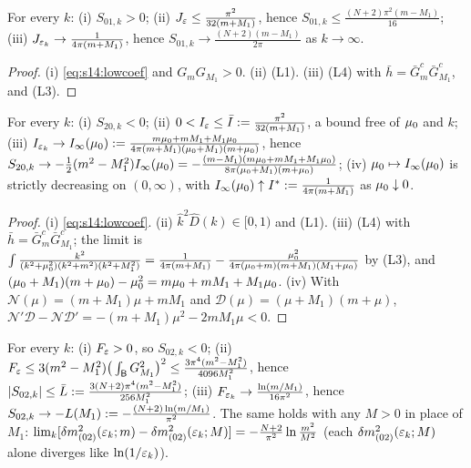 \begin{lemma}\label{lem:s14:A}
For every $k$: \textup{(i)} $S_{01,k}>0$; \textup{(ii)} $J_{\varepsilon}\le\frac{\pi^2}{32(m+M_1)}$, hence $S_{01,k}\le\frac{(N+2)\pi^2(m-M_1)}{16}$; \textup{(iii)} $J_{\varepsilon_k}\to\frac1{4\pi(m+M_1)}$, hence $S_{01,k}\to\frac{(N+2)(m-M_1)}{2\pi}$ as $k\to\infty$.
\end{lemma}

\begin{proof}
(i) \eqref{eq:s14:lowcoef} and $G_mG_{M_1}>0$. (ii) (L1). (iii) (L4) with $\bar h=\bar G^c_m\bar G^c_{M_1}$, and (L3).
\end{proof}

\begin{lemma}[order $e^2$]\label{lem:s14:B}
For every $k$: \textup{(i)} $S_{20,k}<0$; \textup{(ii)} $0<I_{\varepsilon}\le\bar I:=\frac{\pi^2}{32(m+M_1)}$, a bound free of $\mu_0$ and $k$; \textup{(iii)} $I_{\varepsilon_k}\to I_\infty(\mu_0):=\frac{m\mu_0+mM_1+M_1\mu_0}{4\pi(m+M_1)(\mu_0+M_1)(m+\mu_0)}$, hence $S_{20,k}\to-\frac12(m^2-M_1^2)I_\infty(\mu_0)=-\frac{(m-M_1)(m\mu_0+mM_1+M_1\mu_0)}{8\pi(\mu_0+M_1)(m+\mu_0)}$; \textup{(iv)} $\mu_0\mapsto I_\infty(\mu_0)$ is strictly decreasing on $(0,\infty)$, with $I_\infty(\mu_0)\uparrow I^*:=\frac1{4\pi(m+M_1)}$ as $\mu_0\downarrow0$.
\end{lemma}

\begin{proof}
(i) \eqref{eq:s14:lowcoef}. (ii) $\hat k^2\hat D(k)\in[0,1)$ and (L1). (iii) (L4) with $\bar h=\bar G^c_m\bar G^c_{M_1}$; the limit is $\int\frac{k^2}{(k^2+\mu_0^2)(k^2+m^2)(k^2+M_1^2)}=\frac1{4\pi(m+M_1)}-\frac{\mu_0^2}{4\pi(\mu_0+m)(m+M_1)(M_1+\mu_0)}$ by (L3), and $(\mu_0+M_1)(m+\mu_0)-\mu_0^2=m\mu_0+mM_1+M_1\mu_0$. (iv) With $\mathcal N(\mu)=(m+M_1)\mu+mM_1$ and $\mathcal D(\mu)=(\mu+M_1)(m+\mu)$, $\mathcal N'\mathcal D-\mathcal N\mathcal D'=-(m+M_1)\mu^2-2mM_1\mu<0$.
\end{proof}

\begin{lemma}\label{lem:s14:C}
For every $k$: \textup{(i)} $F_{\varepsilon}>0$, so $S_{02,k}<0$; \textup{(ii)} $F_{\varepsilon}\le3(m^2-M_1^2)\big(\int_{\mathsf B} G_{M_1}^2\big)^2\le\frac{3\pi^4(m^2-M_1^2)}{4096M_1^2}$, hence $|S_{02,k}|\le\bar L:=\frac{3(N+2)\pi^4(m^2-M_1^2)}{256M_1^2}$; \textup{(iii)} $F_{\varepsilon_k}\to\frac{\ln(m/M_1)}{16\pi^2}$, hence $S_{02,k}\to-L(M_1):=-\frac{(N+2)\ln(m/M_1)}{\pi^2}$. The same holds with any $M>0$ in place of $M_1$: $\lim_k[\delta m^2_{(02)}(\varepsilon_k;m)-\delta m^2_{(02)}(\varepsilon_k;M)]=-\frac{N+2}{\pi^2}\ln\frac{m^2}{M^2}$ (each $\delta m^2_{(02)}(\varepsilon_k;M)$ alone diverges like $\ln(1/\varepsilon_k)$).
\end{lemma}

